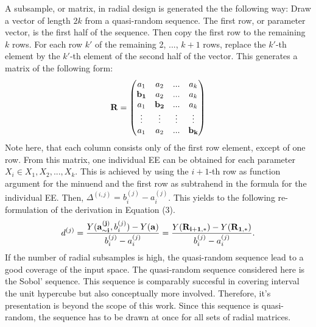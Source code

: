 \documentclass[a4paper,12pt]{article}
\begin{document}
\noindent
A subsample, or matrix, in radial design is generated the the following way: Draw a vector of length $2k$ from a quasi-random sequence. The first row, or parameter vector, is the first half of the sequence. Then copy the first row to the remaining $k$ rows. For each row $k'$ of the remaining 2, ..., $k+1$ rows, replace the $k'$-th element by the $k'$-th element of the second half of the vector. This generates a matrix of the following form:
\begin{align}
\bold{R} =
\begin{pmatrix}
a_1 & a_2 & ... & a_k \\
\bold{b_1} & a_2 & ... & a_k \\
a_1 & \bold{b_2} & ... & a_k \\
\vdots & \vdots & \vdots & \vdots\\
a_1 & a_2 & ... & \bold{b_k}
\end{pmatrix}
\end{align}
\noindent
Note here, that each column consists only of the first row element, except of one row.
From this matrix, one individual EE can be obtained for each parameter $X_i \in X_1, X_2, ..., X_k$. This is achieved by using the $i+1$-th row as function argument for the minuend and the first row as subtrahend in the formula for the individual EE. Then, $\Delta^{(i,j)} = b_i^{(j)} - a_i^{(j)}$. This yields to the following re-formulation of the derivation in Equation (3).
\begin{align}
d^{(j)} =  \frac{Y(\bold{a_{\sim i}^{(j)}}, b_i^{(j)}) - Y(\bold{a})}{b_i^{(j)} - a_i^{(j)}} = \frac{Y(\bold{R_{i+1,*}}) -  Y(\bold{R_{1,*}})}{b_i^{(j)} - a_i^{(j)}}.
\end{align}
If the number of radial subsamples is high, the quasi-random sequence lead to a good coverage of the input space. The quasi-random sequence considered here is the Sobol' sequence. This sequence is comparably succesful in covering interval the unit hypercube but also conceptually more involved. Therefore, it's presentation is beyond the scope of this work. Since this sequence is quasi-random, the sequence has to be drawn at once for all sets of radial matrices.\\
\end{document}
